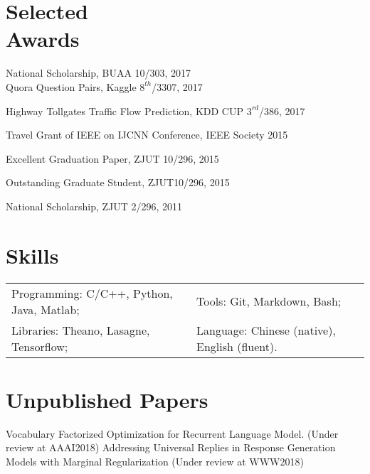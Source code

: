 \documentclass[margin,line]{resume}
\begin{document}
\begin{resume}
%




\section{Selected \\ Awards}

National Scholarship, BUAA \hfill {10/303, 2017}\\
Quora Question Pairs, Kaggle \hfill {$8^{th}$/3307, 2017} 

Highway Tollgates Traffic Flow Prediction, KDD CUP  \hfill {$3^{rd}$/386, 2017}

Travel Grant of IEEE on IJCNN Conference, IEEE Society \hfill { 2015}

Excellent Graduation Paper, ZJUT \hfill {10/296, 2015}

Outstanding Graduate Student, ZJUT\hfill {10/296, 2015}


National Scholarship, ZJUT \hfill {2/296, 2011}




\section{ Skills}
\begin{tabular}{@{}p{3.2in}p{4in}}
Programming: C/C++, Python, Java, Matlab;& Tools: Git, Markdown, Bash; \\
Libraries: Theano, Lasagne, Tensorflow;  & Language: Chinese (native), English (fluent). 
\end{tabular}


\section{Unpublished Papers}
Vocabulary Factorized Optimization for Recurrent Language Model. (Under review at AAAI2018)
Addressing Universal Replies in Response Generation Models with Marginal Regularization (Under review at WWW2018)\\

\end{resume}
\end{document}
